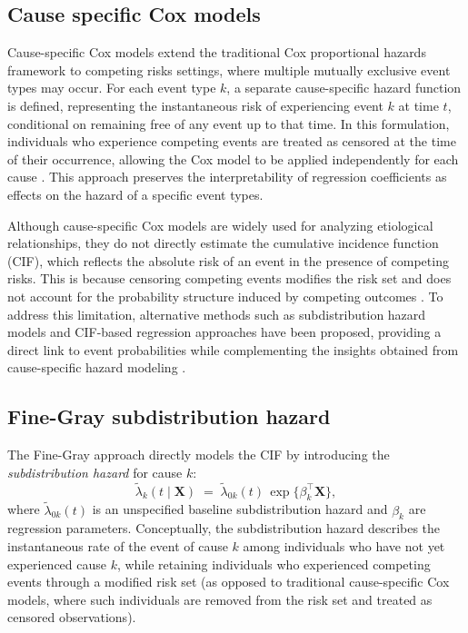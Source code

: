 \documentclass[a4paper,twoside,12pt]{report}
\begin{document}
\subsection{Cause specific Cox models}
Cause-specific Cox models extend the traditional Cox proportional hazards framework to competing risks settings, where multiple mutually exclusive event types may occur. For each event type \(k\), a separate cause-specific hazard function is defined, representing the instantaneous risk of experiencing event \(k\) at time \(t\), conditional on remaining free of any event up to that time. In this formulation, individuals who experience competing events are treated as censored at the time of their occurrence, allowing the Cox model to be applied independently for each cause \citep{prentice1978analysis, latouche2013competing}. This approach preserves the interpretability of regression coefficients as effects on the hazard of a specific event types.

Although cause-specific Cox models are widely used for analyzing etiological relationships, they do not directly estimate the cumulative incidence function (CIF), which reflects the absolute risk of an event in the presence of competing risks. This is because censoring competing events modifies the risk set and does not account for the probability structure induced by competing outcomes \citep{kalbfleisch2002statistical, pintilie2006competing}. To address this limitation, alternative methods such as subdistribution hazard models and CIF-based regression approaches have been proposed, providing a direct link to event probabilities while complementing the insights obtained from cause-specific hazard modeling \citep{FineGray1999, andersen2012competing}.


\subsection{Fine-Gray subdistribution hazard}

The Fine-Gray approach \citep{FineGray1999} directly models the CIF by introducing the \emph{subdistribution hazard} for cause \(k\):
\begin{equation}\label{eq:fg-model}
\tilde\lambda_k(t\mid \boldsymbol{X}) \;=\; \tilde\lambda_{0k}(t)\,\exp\{\beta_k^\top \boldsymbol{X}\},
\end{equation}
where \(\tilde\lambda_{0k}(t)\) is an unspecified baseline subdistribution hazard and \(\beta_k\) are regression parameters. Conceptually, the subdistribution hazard describes the instantaneous rate of the event of cause \(k\) among individuals who have not yet experienced cause \(k\), while retaining individuals who experienced competing events through a modified risk set (as opposed to traditional cause-specific Cox models, where such individuals are removed from the risk set and treated as censored observations).
\end{document}
